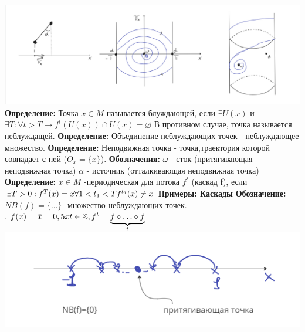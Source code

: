 \documentclass[12pt,a4paper]{article}
\begin{document}
\includegraphics[scale=0.3]{images/Section 3. Dinamic System/allimage}
\newline
\textbf{Определение:} Точка \(x\in M\) называется блуждающей, если \(\exists U(x)\) и \(\exists T : \forall t >T \rightarrow f^t(U(x))\cap U(x) = \varnothing\) 
\newline В противном случае, точка называется неблуждащей.
\newline \textbf{Определение:} Объединение неблуждающих точек - неблуждающее множество.
\newline \textbf{Определение: } Неподвижная точка - точка,траектория которой совпадает с ней (\(O_x = \{x\}\)).
\newline \textbf{Обозначения: } \(\omega\) - сток (притягивающая неподвижная точка)
\newline \(\alpha\) - источник (отталкивающая неподвижная точка)
\newline \textbf{Определение: } \(x \in M\) -периодическая для потока \(f^t\) (каскад f), если \(\exists T > 0: f^T(x)=x \forall \\ 1<t_1 <T  \\ f^{t_1}(x)\neq x\)
\newline \textbf{Примеры: Каскады}
\newline \textbf{Обозначение: } \(NB(f)=\{...\}\)- множество неблуждающих точек.
\\
. \(f(x)= \bar{x}=0,5 x \\ t\in \mathbb{Z}, f^t= \underbrace{f \circ \ldots \circ f}_t\) 
\newline \includegraphics[scale=0.5]{images/Section 3. Dinamic System/kaskad1.png}
\end{document}
